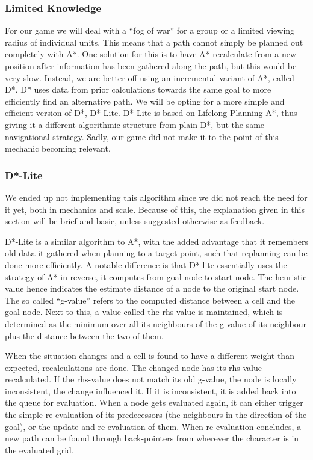 \subsubsection{Limited Knowledge}
For our game we will deal with a ``fog of war'' for a group or a limited viewing radius of individual units. This means that a path cannot simply be planned out completely with A*. One solution for this is to have A* recalculate from a new position after information has been gathered along the path, but this would be very slow. Instead, we are better off using an incremental variant of A*, called D*. D* uses data from prior calculations towards the same goal to more efficiently find an alternative path. We will be opting for a more simple and efficient version of D*, D*-Lite. D*-Lite is based on Lifelong Planning A*, thus giving it a different algorithmic structure from plain D*, but the same navigational strategy. Sadly, our game did not make it to the point of this mechanic becoming relevant.

\subsubsection{D*-Lite}
We ended up not implementing this algorithm since we did not reach the need for it yet, both in mechanics and scale. Because of this, the explanation given in this section will be brief and basic, unless suggested otherwise as feedback.

D*-Lite is a similar algorithm to A*, with the added advantage that it remembers old data it gathered when planning to a target point, such that replanning can be done more efficiently. A notable difference is that D*-lite essentially uses the strategy of A* in reverse, it computes from goal node to start node. The heuristic value hence indicates the estimate distance of a node to the original start node. The so called ``g-value'' refers to the computed distance between a cell and the goal node. Next to this, a value called the rhs-value is maintained, which is determined as the minimum over all its neighbours of the g-value of its neighbour plus the distance between the two of them.

When the situation changes and a cell is found to have a different weight than expected, recalculations are done. The changed node has its rhs-value recalculated. If the rhs-value does not match its old g-value, the node is locally inconsistent, the change influenced it. If it is inconsistent, it is added back into the queue for evaluation. When a node gets evaluated again, it can either trigger the simple re-evaluation of its predecessors (the neighbours in the direction of the goal), or the update and re-evaluation of them. When re-evaluation concludes, a new path can be found through back-pointers from wherever the character is in the evaluated grid.


